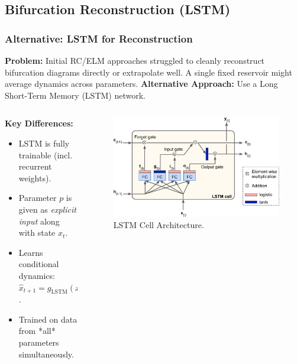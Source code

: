 \documentclass{beamer}
\begin{document}
\subsection{Bifurcation Reconstruction (LSTM)}

\begin{frame}
    \frametitle{Alternative: LSTM for Reconstruction}
    \textbf{Problem:} Initial RC/ELM approaches struggled to cleanly reconstruct bifurcation diagrams directly or extrapolate well. A single fixed reservoir might average dynamics across parameters.
    \pause
    \textbf{Alternative Approach:} Use a Long Short-Term Memory (LSTM) network.
    \begin{columns}[T]
         \begin{column}{0.4\textwidth}
            \textbf{Key Differences:}
            \begin{itemize}
                \item LSTM is fully trainable (incl. recurrent weights).
                \item Parameter $p$ is given as \textit{explicit input} along with state $x_t$.
                \item Learns conditional dynamics: $\hat{x}_{t+1} = g_{\text{LSTM}}(x_t, p; \theta)$.
                \item Trained on data from *all* parameters simultaneously.
            \end{itemize}
         \end{column}
         \begin{column}{0.6\textwidth}
              \begin{figure}
                \includegraphics[width=0.8\linewidth]{figures/LSTM_arch.png}
                \caption{LSTM Cell Architecture.}
                 \label{fig:lstm_arch_slide}
            \end{figure}
         \end{column}
    \end{columns}
\end{frame}
\end{document}
